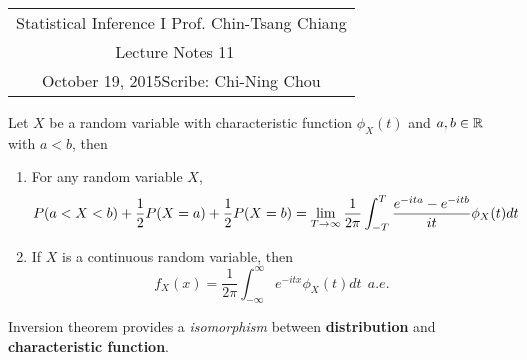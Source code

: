 \documentclass[11pt]{article}
\newcommand{\scribe}{Chi-Ning Chou}
\newcommand{\lecnum}{11}
\newcommand{\lecdate}{October 19, 2015}
\begin{document}
	
	\begin{center}
		\renewcommand{\arraystretch}{2}
		\begin{bfseries}
			\begin{tabular}{|c|}
				\hline
				Statistical Inference I \hfill Prof. Chin-Tsang Chiang\\
				\hspace{15em} {\large Lecture Notes \lecnum} \hspace{15em}\ \\
				\lecdate \hfill Scribe: \scribe\\
				\hline
			\end{tabular}
			\renewcommand{\arraystretch}{1}
		\end{bfseries}
	\end{center}
	
\begin{lemma}
	Let $X$ be a random variable with characteristic function $\phi_X(t)$ and $a,b\in{\mathbb R}$ with $a<b$, then
	\begin{enumerate}
		\item For any random variable $X$,
		$$P(a<X<b) + \frac{1}{2}P(X=a) + \frac{1}{2}P(X=b) = \lim_{T\rightarrow\infty}\frac{1}{2\pi}\int_{-T}^{T}\frac{e^{-ita}-e^{-itb}}{it}\phi_X(t)dt$$
		\item If $X$ is a continuous random variable, then
		$$f_X(x) = \frac{1}{2\pi}\int_{-\infty}^{\infty}e^{-itx}\phi_X(t)dt\ \ a.e.$$
	\end{enumerate}
\end{lemma}

\begin{intuition}
	Inversion theorem provides a {\it isomorphism} between {\bf distribution} and {\bf characteristic function}.
\end{intuition}
\end{document}
